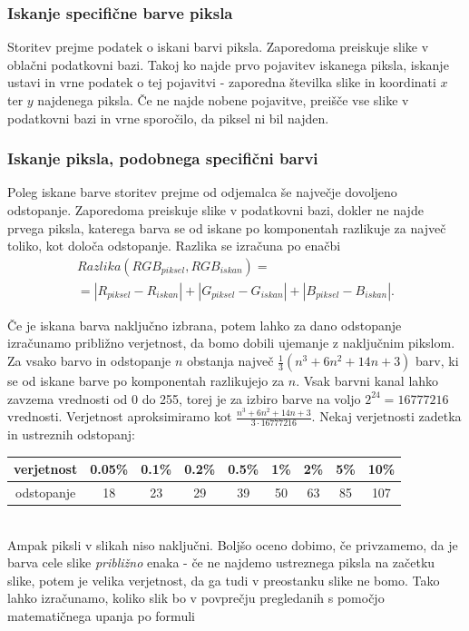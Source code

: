 \subsubsection{Iskanje specifične barve piksla}

Storitev prejme podatek o iskani barvi piksla.
Zaporedoma preiskuje slike v oblačni podatkovni bazi.
Takoj ko najde prvo pojavitev iskanega piksla, iskanje ustavi in vrne podatek o tej pojavitvi - zaporedna številka slike in koordinati $x$ ter $y$ najdenega piksla.
Če ne najde nobene pojavitve, preišče vse slike v podatkovni bazi in vrne sporočilo, da piksel ni bil najden.

\subsubsection{Iskanje piksla, podobnega specifični barvi}

Poleg iskane barve storitev prejme od odjemalca še največje dovoljeno odstopanje.
Zaporedoma preiskuje slike v podatkovni bazi, dokler ne najde prvega piksla, katerega barva se od iskane po komponentah razlikuje za največ toliko, kot določa odstopanje.
Razlika se izračuna po enačbi
\begin{multline} \label{1_eq_odstopanje}
Razlika(RGB_{piksel}, RGB_{iskan}) = \\ = |R_{piksel} - R_{iskan}| + |G_{piksel} - G_{iskan}| + |B_{piksel} - B_{iskan}|.
\end{multline}

Če je iskana barva naključno izbrana, potem lahko za dano odstopanje izračunamo približno verjetnost, da bomo dobili ujemanje z naključnim pikslom.
Za vsako barvo in odstopanje $n$ obstanja največ $\frac{1}{3}(n^3 + 6n^2 + 14n + 3)$ barv, ki se od iskane barve po komponentah razlikujejo za $n$.
Vsak barvni kanal lahko zavzema vrednosti od 0 do 255, torej je za izbiro barve na voljo $2^{24} = 16777216$ vrednosti.
Verjetnost aproksimiramo kot $\frac{n^3 + 6n^2 + 14n + 3}{3 \cdot 16777216}$.
Nekaj verjetnosti zadetka in ustreznih odstopanj: \\ %

\begin{tabular}{c|c c c c c c c c}
verjetnost & 0.05\% & 0.1\% & 0.2\% & 0.5\% & 1\% & 2\% & 5\% & 10\% \\
\hline
odstopanje & 18 & 23 & 29 & 39 & 50 & 63 & 85 & 107
\end{tabular}
\\

Ampak piksli v slikah niso naključni.
Boljšo oceno dobimo, če privzamemo, da je barva cele slike \emph{približno} enaka - če ne najdemo ustreznega piksla na začetku slike, potem je velika verjetnost, da ga tudi v preostanku slike ne bomo.
Tako lahko izračunamo, koliko slik bo v povprečju pregledanih s pomočjo matematičnega upanja po formuli

